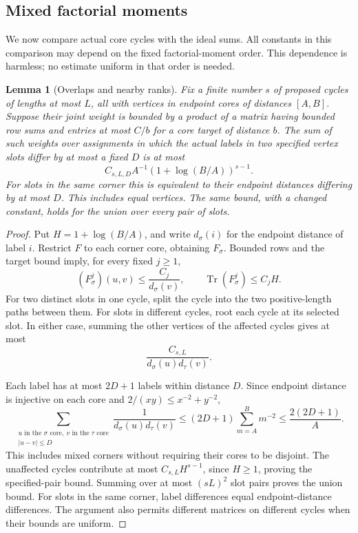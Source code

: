 \documentclass[11pt]{article}
\newtheorem{lemma}[theorem]{Lemma}
\theoremstyle{remark}
\theoremstyle{plain}
\begin{document}
\subsection{Mixed factorial moments}
\label{subsec:sp-factorial-moments}

We now compare actual core cycles with the ideal sums.  All constants in
this comparison may depend on the fixed factorial-moment order.  This
dependence is harmless; no estimate uniform in that order is needed.

\begin{lemma}[Overlaps and nearby ranks]\label{lem:sp-collisions}
Fix a finite number $s$ of proposed cycles of lengths at most $L$, all
with vertices in endpoint cores of distances $[A,B]$.  Suppose their
joint weight is bounded by a product of a matrix having bounded row sums
and entries at most $C/b$ for a core target of distance $b$.  The sum of
such weights over assignments in which the actual labels in two specified
vertex slots differ by at most a fixed $D$ is at most
\begin{equation}\label{eq:sp-collision-sum}
 C_{s,L,D}A^{-1}(1+\log(B/A))^{s-1}.
\end{equation}
For slots in the same corner this is equivalent to their endpoint
distances differing by at most $D$.  This includes equal vertices.
The same bound, with a changed constant,
holds for the union over every pair of slots.
\end{lemma}

\begin{proof}
Put $H=1+\log(B/A)$, and write $d_\sigma(i)$ for the endpoint
distance of label $i$.  Restrict $F$ to each corner core, obtaining
$F_\sigma$.  Bounded rows and the target bound imply, for every
fixed $j\ge1$,
\[
 (F_\sigma^j)(u,v)\le \frac{C_j}{d_\sigma(v)},
 \qquad
 \operatorname{Tr}(F_\sigma^j)\le C_jH.
\]
For two distinct slots in one cycle, split the cycle into the two
positive-length paths between them.  For slots in different cycles,
root each cycle at its selected slot.  In either case, summing the
other vertices of the affected cycles gives at most
\[
 \frac{C_{s,L}}{d_\sigma(u)d_\tau(v)}.
\]

Each label has at most $2D+1$ labels within distance $D$.  Since
endpoint distance is injective on each core and
$2/(xy)\le x^{-2}+y^{-2}$,
\[
 \sum_{\substack{u\text{ in the }\sigma\text{ core},\
                  v\text{ in the }\tau\text{ core}\\ |u-v|\le D}}
 \frac1{d_\sigma(u)d_\tau(v)}
 \le (2D+1)\sum_{m=A}^B m^{-2}
 \le \frac{2(2D+1)}A.
\]
This includes mixed corners without requiring their cores to be
disjoint.  The unaffected cycles contribute at most
$C_{s,L}H^{s-1}$, since $H\ge1$, proving the specified-pair bound.
Summing over at most $(sL)^2$ slot pairs proves the union bound.
For slots in the same corner, label differences equal
endpoint-distance differences.  The argument also permits different
matrices on different cycles when their bounds are uniform.
\end{proof}
\end{document}
